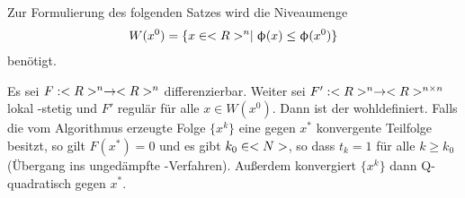 Zur Formulierung des folgenden Satzes wird die Niveaumenge
\begin{align}
	W(x^0) = \{x\in<R>^n\mid \upphi(x) \le \upphi(x^0)\}\notag
\end{align}
benötigt.

\begin{proposition}
	Es sei $F:<R>^n\to<R>^n$ differenzierbar. Weiter sei $F':<R>^n\to<R>^{n\times n}$ lokal -stetig und $F'$ regulär für alle $x\in W(x^0)$. Dann ist der  wohldefiniert. Falls die vom Algorithmus erzeugte Folge $\{x^k\}$ eine gegen $x^\ast$ konvergente Teilfolge besitzt, so gilt $F(x^\ast)=0$ und es gibt $k_0\in<N>$, so dass $t_k=1$ für alle $k\ge k_0$ (Übergang ins ungedämpfte -Verfahren). Außerdem konvergiert $\{x^k\}$ dann Q-quadratisch gegen $x^\ast$.
\end{proposition}
